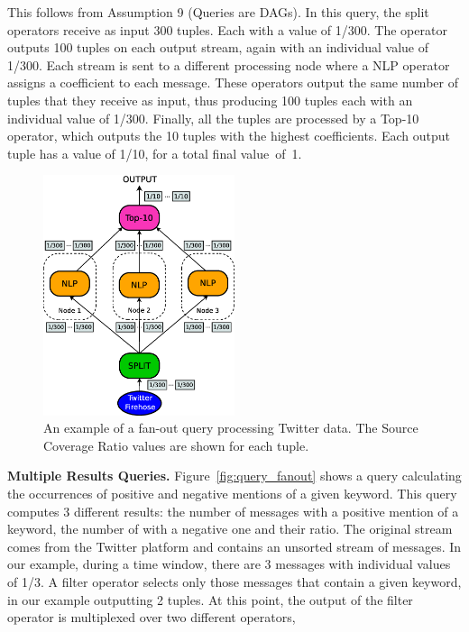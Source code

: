 This follows from Assumption 9 (Queries are DAGs). In this query, the split operators receive as input
300 tuples. Each with a \sic value of 1/300.  The operator outputs 100 tuples on each output stream,
again with an individual \sic value of 1/300. Each stream is sent to a different processing node where a
NLP operator assigns a coefficient to each message. These operators output the same number of tuples
that they receive as input, thus producing 100 tuples each with an individual \sic value of 1/300.
Finally, all the tuples are processed by a Top-10 operator, which outputs the 10 tuples with the
highest coefficients. Each output tuple has a \sic value of 1/10, for a total final \sic value~of~1.

\begin{figure}[t!]
	\centering 
	\includegraphics[width=0.5\textwidth]{img/tesi/fan-out_mr} 
	\caption{An example of a fan-out query processing Twitter data. 
	The Source Coverage Ratio values are shown for each tuple.}
	\label{fig:fanout_mr}
\end{figure}
\vspace{15pt}
\textbf{Multiple Results Queries.} Figure~\ref{fig:query_fanout} shows a query calculating the
occurrences of positive and negative mentions of a given keyword. 
This query computes 3 different results: the number of messages with a positive mention of a keyword,
the number of with a negative one and their ratio.
The original stream comes from the Twitter platform and contains an unsorted stream of messages. In our
example, during a time window, there are 3 messages with individual \sic values of 1/3. A filter
operator selects only those messages that contain a given keyword, in our example outputting 2
tuples.
At this point, the output of the filter operator is multiplexed over two different operators,
